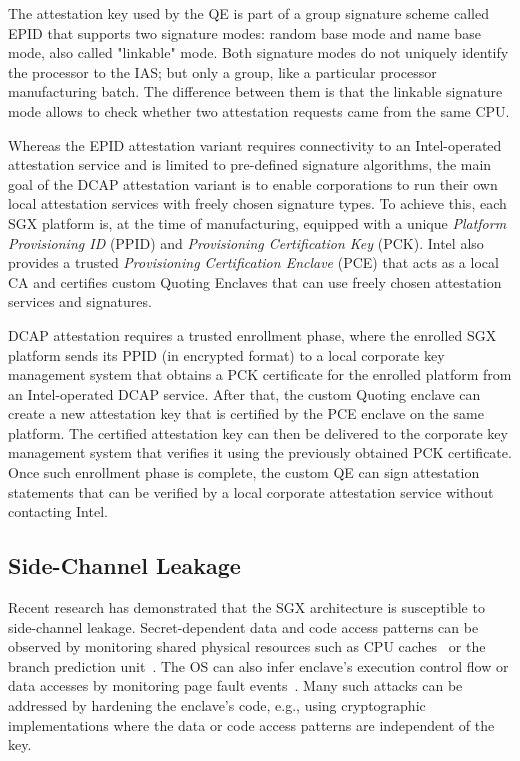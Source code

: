 The attestation key used by the QE is part of a group signature scheme called EPID that supports two signature modes: random base mode and name base mode, also called "linkable" mode. Both signature modes do not uniquely identify the processor to the IAS; but only a group, like a particular processor manufacturing batch. The difference between them is that the linkable signature mode allows to check whether two attestation requests came from the same CPU. 


 Whereas the EPID attestation variant requires connectivity to an Intel-operated attestation service and is limited to pre-defined signature algorithms, the main goal of the DCAP attestation variant is to enable corporations to run their own local attestation services with freely chosen signature types. To achieve this, each SGX platform is, at the time of manufacturing, equipped with a unique \emph{Platform Provisioning ID} (PPID) and \emph{Provisioning Certification Key} (PCK). Intel also provides a trusted \emph{Provisioning Certification Enclave} (PCE) that acts as a local CA and certifies custom Quoting Enclaves that can use freely chosen attestation services and signatures.

DCAP attestation requires a trusted enrollment phase, where the enrolled SGX platform sends its PPID (in encrypted format) to a local corporate key management system that obtains a PCK certificate for the enrolled platform from an Intel-operated DCAP service. After that, the custom Quoting enclave can create a new attestation key that is certified by the PCE enclave on the same platform. The certified attestation key can then be delivered to the corporate key management system that verifies it using the previously obtained PCK certificate. Once such enrollment phase is complete, the custom QE can sign attestation statements that can be verified by a local corporate attestation service without contacting Intel.



\subsection{Side-Channel Leakage}
\label{sec:background:attacks}

Recent research has demonstrated that the SGX architecture is susceptible to side-channel leakage. Secret-dependent data and code access patterns can be observed by monitoring shared physical resources such as CPU caches~\cite{sgxcache,gotzfried2017cache,moghimi2017cachezoom} or the branch prediction unit~\cite{lee2017inferring}. The OS can also infer enclave's execution control flow or data accesses by monitoring page fault events~\cite{xu2015controlled}. Many such attacks can be addressed by hardening the enclave's code, e.g., using cryptographic implementations where the data or code access patterns are independent of the key.

